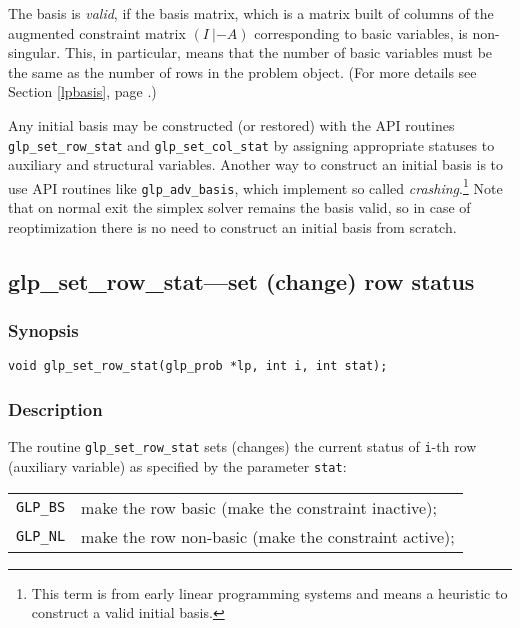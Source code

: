 The basis is {\it valid}, if the basis matrix, which is a matrix built
of columns of the augmented constraint matrix $(I\:|-A)$ corresponding
to basic variables, is non-singular. This, in particular, means that
the number of basic variables must be the same as the number of rows in
the problem object. (For more details see Section \ref{lpbasis}, page
\pageref{lpbasis}.)

Any initial basis may be constructed (or restored) with the API
routines \verb|glp_set_row_stat| and \verb|glp_set_col_stat| by
assigning appropriate statuses to auxiliary and structural variables.
Another way to construct an initial basis is to use API routines like
\verb|glp_adv_basis|, which implement so called
{\it crashing}.\footnote{This term is from early linear programming
systems and means a heuristic to construct a valid initial basis.} Note
that on normal exit the simplex solver remains the basis valid, so in
case of reoptimization there is no need to construct an initial basis
from scratch.

\subsection{glp\_set\_row\_stat---set (change) row status}

\subsubsection*{Synopsis}

\begin{verbatim}
void glp_set_row_stat(glp_prob *lp, int i, int stat);
\end{verbatim}

\subsubsection*{Description}

The routine \verb|glp_set_row_stat| sets (changes) the current status
of \verb|i|-th row (auxiliary variable) as specified by the parameter
\verb|stat|:

\begin{tabular}{@{}lp{104.2mm}@{}}
\verb|GLP_BS| & make the row basic (make the constraint inactive); \\
\verb|GLP_NL| & make the row non-basic (make the constraint active); \\
\end{tabular}

\newpage

